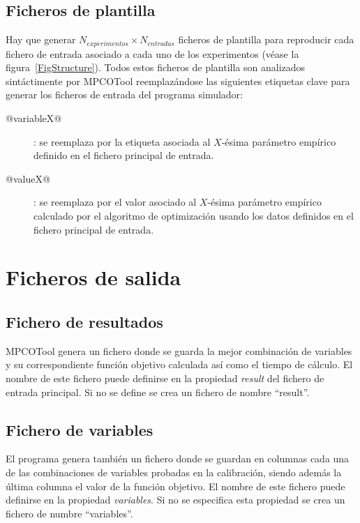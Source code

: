 \documentclass[a4paper]{report}
\begin{document}
\subsection{Ficheros de plantilla}

Hay que generar $N_{experimentos}\times N_{entradas}$ ficheros de plantilla para
reproducir cada fichero de entrada asociado a cada uno de los experimentos
(véase la figura~\ref{FigStructure}). Todos estos ficheros de plantilla son
analizados sintáctimente por MPCOTool reemplazándose las siguientes etiquetas
clave para generar los ficheros de entrada del programa simulador:
\begin{description}
\item[@variableX@]: se reemplaza por la etiqueta asociada al $X$-ésima parámetro
	empírico definido en el fichero principal de entrada.
\item[@valueX@]: se reemplaza por el valor asociado al $X$-ésima parámetro
	empírico calculado por el algoritmo de optimización usando los datos
	definidos en el fichero principal de entrada.
\end{description}

\section{Ficheros de salida}

\subsection{Fichero de resultados}

MPCOTool genera un fichero donde se guarda la mejor combinación de variables y
su correspondiente función objetivo calculada así como el tiempo de cálculo. El
nombre de este fichero puede definirse en la propiedad \emph{result} del fichero
de entrada principal. Si no se define se crea un fichero de nombre ``result''.

\subsection{Fichero de variables}

El programa genera también un fichero donde se guardan en columnas cada una de
las combinaciones de variables probadas en la calibración, siendo además la
última columna el valor de la función objetivo. El nombre de este fichero puede
definirse en la propiedad \emph{variables}. Si no se especifica esta propiedad
se crea un fichero de numbre ``variables''.
\end{document}
